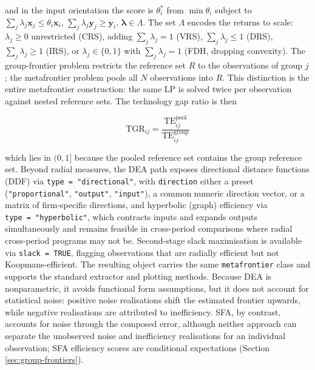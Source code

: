 and in the input orientation the score is \(\theta^*_i\) from
\(\min \theta_i\) subject to
\(\sum_j \lambda_j \mathbf{x}_j \leq \theta_i \mathbf{x}_i\),
\(\sum_j \lambda_j \mathbf{y}_j \geq \mathbf{y}_i\),
\(\boldsymbol{\lambda} \in \Lambda\). The set \(\Lambda\) encodes the returns to
scale: \(\lambda_j \geq 0\) unrestricted (CRS), adding
\(\sum_j \lambda_j = 1\) (VRS), \(\sum_j \lambda_j \leq 1\) (DRS),
\(\sum_j \lambda_j \geq 1\) (IRS), or \(\lambda_j \in \{0, 1\}\) with
\(\sum_j \lambda_j = 1\) (FDH, dropping convexity). The group-frontier
problem restricts the reference set \(R\) to the observations of group \(j\);
the metafrontier problem pools all \(N\) observations into \(R\). This
distinction is the entire metafrontier construction: the same LP is solved
twice per observation against nested reference sets. The technology gap
ratio is then

\begin{equation}
\text{TGR}_{ij} =
\frac{\text{TE}^{\text{pool}}_{ij}}{\text{TE}^{\text{group}}_{ij}}
\label{eq:tgr-dea}
\end{equation}

which lies in \((0, 1]\) because the pooled reference set contains the group
reference set. Beyond radial measures, the DEA path exposes directional
distance functions (DDF) via \texttt{type\ =\ "directional"}, with \texttt{direction}
either a preset (\texttt{"proportional"}, \texttt{"output"}, \texttt{"input"}), a common numeric
direction vector, or a matrix of firm-specific directions, and hyperbolic
(graph) efficiency via \texttt{type\ =\ "hyperbolic"}, which contracts inputs and
expands outputs simultaneously and remains feasible in cross-period
comparisons where radial cross-period programs may not be. Second-stage
slack maximisation is available via \texttt{slack\ =\ TRUE}, flagging observations
that are radially efficient but not Koopmans-efficient. The resulting
object carries the same \texttt{metafrontier} class and supports the standard
extractor and plotting methods. Because DEA is nonparametric, it avoids
functional form assumptions, but it does not account for statistical noise:
positive noise realisations shift the estimated frontier upwards, while
negative realisations are attributed to inefficiency. SFA, by contrast,
accounts for noise through the composed error, although neither approach
can separate the unobserved noise and inefficiency realisations for an
individual observation; SFA efficiency scores are conditional expectations
(Section \ref{sec:group-frontiers}).

